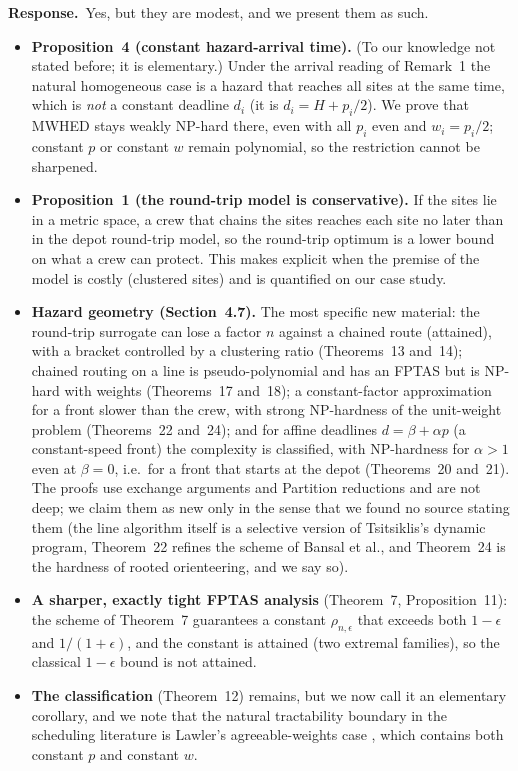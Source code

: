 \documentclass[11pt]{article}
\newcommand{\reply}{\noindent\textbf{Response.}\ }
\begin{document}
\reply Yes, but they are modest, and we present them as such.

\begin{itemize}[leftmargin=*,itemsep=2pt]
\item \textbf{Proposition~4 (constant hazard-arrival time).} (To our
knowledge not stated before; it is elementary.) Under the
arrival reading of Remark~1 the natural homogeneous case is a hazard that
reaches all sites at the same time, which is \emph{not} a constant
deadline $d_i$ (it is $d_i=H+p_i/2$). We prove that MWHED stays weakly
NP-hard there, even with all $p_i$ even and $w_i=p_i/2$; constant $p$ or
constant $w$ remain polynomial, so the restriction cannot be sharpened.
\item \textbf{Proposition~1 (the round-trip model is conservative).} If
the sites lie in a metric space, a crew that chains the sites reaches each
site no later than in the depot round-trip model, so the round-trip
optimum is a lower bound on what a crew can protect. This makes explicit
when the premise of the model is costly (clustered sites) and is
quantified on our case study.
\item \textbf{Hazard geometry (Section~4.7).} The most specific new
material: the round-trip surrogate can lose a factor $n$ against a chained
route (attained), with a bracket controlled by a clustering ratio
(Theorems~13 and~14); chained routing on a line is pseudo-polynomial and
has an FPTAS but is NP-hard with weights (Theorems~17 and~18); a constant-factor
approximation for a front slower than the crew, with strong NP-hardness of
the unit-weight problem (Theorems~22 and~24); and for
affine deadlines $d=\beta+\alpha p$ (a constant-speed front) the
complexity is classified, with NP-hardness for $\alpha>1$ even at
$\beta=0$, i.e.\ for a front that starts at the depot (Theorems~20
and~21). The proofs use exchange arguments and Partition reductions and
are not deep; we claim them as new only in the sense that we found no
source stating them (the line algorithm itself is a selective version of
Tsitsiklis's dynamic program, Theorem~22 refines the scheme of Bansal et al.,
and Theorem~24 is the hardness of rooted orienteering, and we say so).
\item \textbf{A sharper, exactly tight FPTAS analysis} (Theorem~7,
Proposition~11): the scheme of Theorem~7 guarantees a constant
$\rho_{n,\epsilon}$ that exceeds both $1-\epsilon$ and $1/(1+\epsilon)$,
and the constant is attained (two extremal families), so the classical
$1-\epsilon$ bound is not attained.
\item \textbf{The classification} (Theorem~12) remains, but we now call it
an elementary corollary, and we note that the natural tractability
boundary in the scheduling literature is Lawler's agreeable-weights case
\citep{lawler1976}, which contains both constant $p$ and constant $w$.
\end{itemize}
\end{document}
